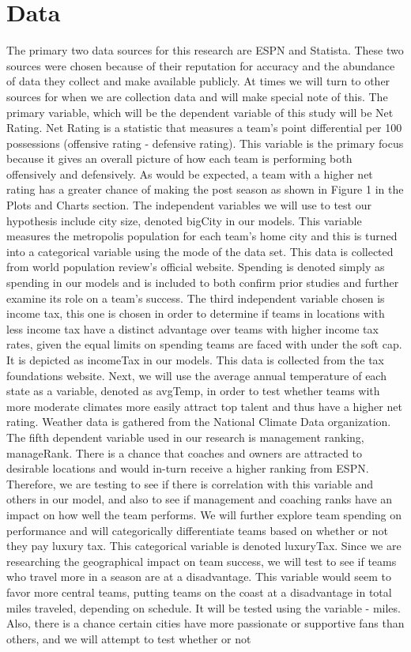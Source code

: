\documentclass[12pt,english]{article}
\begin{document}
\section{Data}\label{sec:data}
The primary two data sources for this research are ESPN and Statista. \newline
These two sources were chosen because of their reputation for accuracy and the abundance of data they collect and make available publicly. At times we will turn to other sources for when we are collection data and will make special note of this. The primary variable, which will be the dependent variable of this study will be Net Rating. Net Rating is a statistic that measures a team's point differential per 100 possessions (offensive rating - defensive rating). This variable is the primary focus because it gives an overall picture of how each team is performing both offensively and defensively. As would be expected, a team with a higher net rating has a greater chance of making the post season as shown in Figure 1 in the Plots and Charts section. The independent variables we will use to test our hypothesis include city size, denoted bigCity in our models. This variable measures the metropolis population for each team's home city and this is turned into a categorical variable using the mode of the data set. This data is collected from world population review's official website. Spending is denoted simply as spending in our models and is included to both confirm prior studies and further examine its role on a team's success. The third independent variable chosen is income tax, this one is chosen in order to determine if teams in locations with less income tax have a distinct advantage over teams with higher income tax rates, given the equal limits on spending teams are faced with under the soft cap. It is depicted as incomeTax in our models. This data is collected from the tax foundations website. Next, we will use the average annual temperature of each state as a variable, denoted as avgTemp, in order to test whether teams with more moderate climates more easily attract top talent and thus have a higher net rating. Weather data is gathered from the National Climate Data organization. The fifth dependent variable used in our research is management ranking, manageRank. There is a chance that coaches and owners are attracted to desirable locations and would in-turn receive a higher ranking from ESPN. Therefore, we are testing to see if there is correlation with this variable and others in our model, and also to see if management and coaching ranks have an impact on how well the team performs. We will further explore team spending on performance and will categorically differentiate teams based on whether or not they pay luxury tax. This categorical variable is denoted luxuryTax. Since we are researching the geographical impact on team success, we will test to see if teams who travel more in a season are at a disadvantage. This variable would seem to favor more central teams, putting teams on the coast at a disadvantage in total miles traveled, depending on schedule. It will be tested using the variable - miles. Also, there is a chance certain cities have more passionate or supportive fans than others, and we will attempt to test whether or not 
\end{document}
